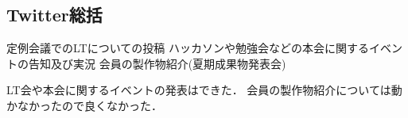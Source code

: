 \subsection*{Twitter総括}

定例会議でのLTについての投稿
ハッカソンや勉強会などの本会に関するイベントの告知及び実況
会員の製作物紹介(夏期成果物発表会) 

LT会や本会に関するイベントの発表はできた．
会員の製作物紹介については動かなかったので良くなかった．
